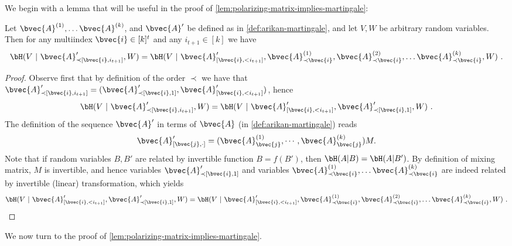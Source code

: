 \documentclass[11pt]{article}
\begin{document}
We begin with a lemma that will be useful in the proof of \cref{lem:polarizing-matrix-implies-martingale}:
\begin{lemma}
	\label{lem:pushing-back-cond}
	Let $\bvec{A}^{(1)}, \ldots \bvec{A}^{(k)}$, and $\bvec{A}'$ be defined as in \cref{def:arikan-martingale}, and let $V, W$ be arbitrary random variables. Then for any multiindex $\bvec{i} \in [k]^{t}$ and any $i_{t+1} \in [k]$ we have
	\begin{equation*}
		\bH(V ~|~ \bvec{A}'_{\prec [\bvec{i}, i_{t+1}]}, W)
		= \bH(V ~|~ \bvec{A}'_{[\bvec{i}, < i_{t+1}]}, \bvec{A}^{(1)}_{\prec \bvec{i}}, \bvec{A}^{(2)}_{\prec \bvec{i}},\ldots \bvec{A}^{(k)}_{\prec \bvec{i}}, W) \ .
	\end{equation*}
\end{lemma}
\begin{proof}
	Observe first that by definition of the order $\prec$ we have that $\bvec{A}'_{\prec [\bvec{i}, i_{t+1}]} = (\bvec{A}'_{\prec [\bvec{i}, 1]}, \bvec{A}'_{[\bvec{i}, < i_{t+1}]})$, hence
	\begin{equation*}
		\bH(V ~|~ \bvec{A}'_{\prec [\bvec{i}, i_{t+1}]}, W) =
		\bH(V ~|~ \bvec{A}'_{[\bvec{i}, < i_{t+1}]}, \bvec{A}'_{\prec [\bvec{i}, 1]}, W) \ .
	\end{equation*}
	The definition of the sequence $\bvec{A}'$ in terms of $\bvec{A}$ (in \cref{def:arikan-martingale}) reads
	\begin{equation*}
		\bvec{A}'_{[\bvec{j}, \cdot]} = (\bvec{A}_{\bvec{j}}^{(1)}, \cdots, \bvec{A}_{\bvec{j}}^{(k)}) M.
	\end{equation*}
	Note that if random variables $B, B'$ are related by invertible function $B = f(B')$, then $\bH(A | B) = \bH(A | B')$. By definition of mixing matrix, $M$ is invertible, and hence variables $\bvec{A}'_{\prec [\bvec{i},1]}$ and variables $\bvec{A}_{\prec \bvec{i}}^{(1)}, \ldots \bvec{A}_{\prec \bvec{i}}^{(k)}$ are indeed related by invertible (linear) transformation, which yields
	\begin{equation*}
		\bH(V ~|~ \bvec{A}'_{[\bvec{i}, < i_{t+1}]}, \bvec{A}'_{\prec [\bvec{i}, 1]},W)
		= \bH(V ~|~ \bvec{A}'_{[\bvec{i}, < i_{t+1}]}, \bvec{A}^{(1)}_{\prec \bvec{i}}, \bvec{A}^{(2)}_{\prec \bvec{i}},\ldots \bvec{A}^{(k)}_{\prec \bvec{i}}, W)
		\ .
		\qedhere
	\end{equation*}
\end{proof}

We now turn to the proof of \cref{lem:polarizing-matrix-implies-martingale}.
\end{document}

